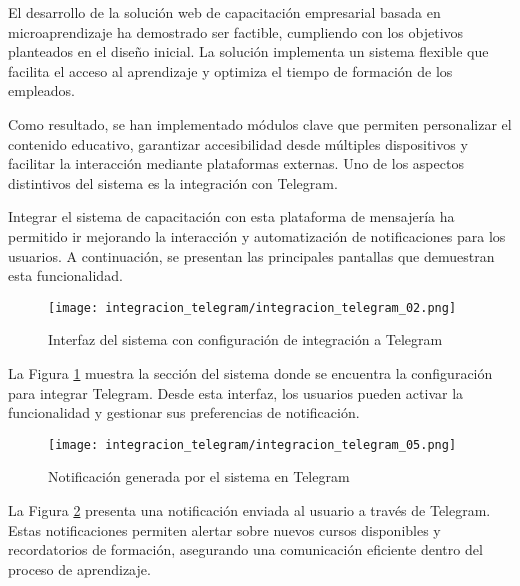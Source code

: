
El desarrollo de la solución web de capacitación empresarial basada en
microaprendizaje ha demostrado ser factible, cumpliendo con los objetivos
planteados en el diseño inicial. La solución implementa un sistema flexible
que facilita el acceso al aprendizaje y optimiza el tiempo de formación de los
empleados.

Como resultado, se han implementado módulos clave que permiten personalizar el
contenido educativo, garantizar accesibilidad desde múltiples dispositivos y
facilitar la interacción mediante plataformas externas. Uno de los aspectos
distintivos del sistema es la integración con Telegram.

Integrar el sistema de capacitación con esta plataforma de mensajería ha
permitido ir mejorando la interacción y automatización de notificaciones para
los usuarios. A continuación, se presentan las principales pantallas que
demuestran esta funcionalidad.

\begin{figure}[H]
    \centering
    \texttt{[image: integracion\_telegram/integracion\_telegram\_02.png]}
    \caption{Interfaz del sistema con configuración de integración a Telegram}
    \label{fig:interfaz_integracion_telegram}
\end{figure}

La Figura \ref{fig:interfaz_integracion_telegram} muestra la sección del sistema
donde se encuentra la configuración para integrar Telegram. Desde esta interfaz,
los usuarios pueden activar la funcionalidad y gestionar sus preferencias de
notificación.

\begin{figure}[H]
    \centering
    \texttt{[image: integracion\_telegram/integracion\_telegram\_05.png]}
    \caption{Notificación generada por el sistema en Telegram}
    \label{fig:notificacion_telegram}
\end{figure}

La Figura \ref{fig:notificacion_telegram} presenta una notificación enviada al
usuario a través de Telegram. Estas notificaciones permiten alertar sobre nuevos
cursos disponibles y recordatorios de formación, asegurando una comunicación
eficiente dentro del proceso de aprendizaje.

